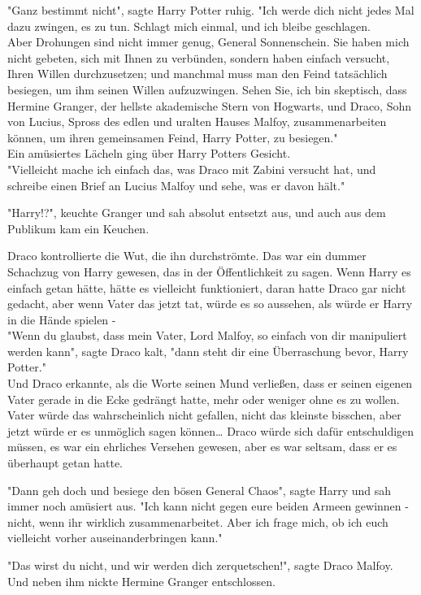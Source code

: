 {"Ganz bestimmt nicht", sagte Harry Potter ruhig. "Ich werde dich nicht jedes Mal dazu zwingen, es zu tun. Schlagt mich einmal, und ich bleibe geschlagen.\\ Aber Drohungen sind nicht immer genug, General Sonnenschein. Sie haben mich nicht gebeten, sich mit Ihnen zu verbünden, sondern haben einfach versucht, Ihren Willen durchzusetzen; und manchmal muss man den Feind tatsächlich besiegen, um ihm seinen Willen aufzuzwingen. Sehen Sie, ich bin skeptisch, dass Hermine Granger, der hellste akademische Stern von Hogwarts, und Draco, Sohn von Lucius, Spross des edlen und uralten Hauses Malfoy, zusammenarbeiten können, um ihren gemeinsamen Feind, Harry Potter, zu besiegen."\\ Ein amüsiertes Lächeln ging über Harry Potters Gesicht.\\ "Vielleicht mache ich einfach das, was Draco mit Zabini versucht hat, und schreibe einen Brief an Lucius Malfoy und sehe, was er davon hält."

"Harry!?", keuchte Granger und sah absolut entsetzt aus, und auch aus dem Publikum kam ein Keuchen.

Draco kontrollierte die Wut, die ihn durchströmte. Das war ein dummer Schachzug von Harry gewesen, das in der Öffentlichkeit zu sagen. Wenn Harry es einfach getan hätte, hätte es vielleicht funktioniert, daran hatte Draco gar nicht gedacht, aber wenn Vater das jetzt tat, würde es so aussehen, als würde er Harry in die Hände spielen -\\ "Wenn du glaubst, dass mein Vater, Lord Malfoy, so einfach von dir manipuliert werden kann", sagte Draco kalt, "dann steht dir eine Überraschung bevor, Harry Potter."\\ Und Draco erkannte, als die Worte seinen Mund verließen, dass er seinen eigenen Vater gerade in die Ecke gedrängt hatte, mehr oder weniger ohne es zu wollen.\\ Vater würde das wahrscheinlich nicht gefallen, nicht das kleinste bisschen, aber jetzt würde er es unmöglich sagen können… Draco würde sich dafür entschuldigen müssen, es war ein ehrliches Versehen gewesen, aber es war seltsam, dass er es überhaupt getan hatte.

"Dann geh doch und besiege den bösen General Chaos", sagte Harry und sah immer noch amüsiert aus. "Ich kann nicht gegen eure beiden Armeen gewinnen - nicht, wenn ihr wirklich zusammenarbeitet. Aber ich frage mich, ob ich euch vielleicht vorher auseinanderbringen kann."

"Das wirst du nicht, und wir werden dich zerquetschen!", sagte Draco Malfoy.\\ Und neben ihm nickte Hermine Granger entschlossen.

}
